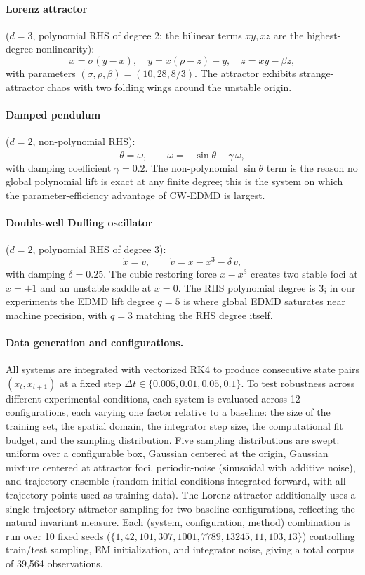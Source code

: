 \documentclass{article}
\begin{document}
\paragraph{Lorenz attractor} ($d=3$, polynomial RHS of degree 2; the bilinear terms $xy, xz$ are the highest-degree nonlinearity):
\[
\dot{x} = \sigma(y - x), \quad
\dot{y} = x(\rho - z) - y, \quad
\dot{z} = x y - \beta z,
\]
with parameters $(\sigma, \rho, \beta) = (10, 28, 8/3)$. The attractor exhibits strange-attractor chaos with two folding wings around the unstable origin.

\paragraph{Damped pendulum} ($d=2$, non-polynomial RHS):
\[
\dot{\theta} = \omega, \qquad
\dot{\omega} = -\sin\theta - \gamma\, \omega,
\]
with damping coefficient $\gamma = 0.2$. The non-polynomial $\sin\theta$ term is the reason no global polynomial lift is exact at any finite degree; this is the system on which the parameter-efficiency advantage of CW-EDMD is largest.

\paragraph{Double-well Duffing oscillator} ($d=2$, polynomial RHS of degree 3):
\[
\dot{x} = v, \qquad
\dot{v} = x - x^3 - \delta\, v,
\]
with damping $\delta = 0.25$. The cubic restoring force $x - x^3$ creates two stable foci at $x = \pm 1$ and an unstable saddle at $x = 0$. The RHS polynomial degree is 3; in our experiments the EDMD lift degree $q{=}5$ is where global EDMD saturates near machine precision, with $q{=}3$ matching the RHS degree itself.


\paragraph{Data generation and configurations.} All systems are integrated with 
vectorized RK4 to produce consecutive state pairs $(x_t, x_{t+1})$ at a fixed step 
$\Delta t \in \{0.005, 0.01, 0.05, 0.1\}$. To test robustness across different experimental conditions, each system 
is evaluated across 12 configurations, each varying one factor relative to a baseline: 
the size of the training set, the spatial domain, the integrator step size, the 
computational fit budget, and the sampling distribution. Five sampling distributions 
are swept: uniform over a configurable box, Gaussian centered at the origin, Gaussian 
mixture centered at attractor foci, periodic-noise (sinusoidal with additive noise), 
and trajectory ensemble (random initial conditions integrated forward, with all 
trajectory points used as training data). The Lorenz attractor additionally uses a 
single-trajectory attractor sampling for two baseline configurations, reflecting the 
natural invariant measure. Each (system, configuration, method) combination is run 
over 10 fixed seeds ($\{1, 42, 101, 307, 1001, 7789, 13245, 11, 103, 13\}$) controlling train/test sampling, EM initialization, and integrator 
noise, giving a total corpus of 39,564 observations.
\end{document}
